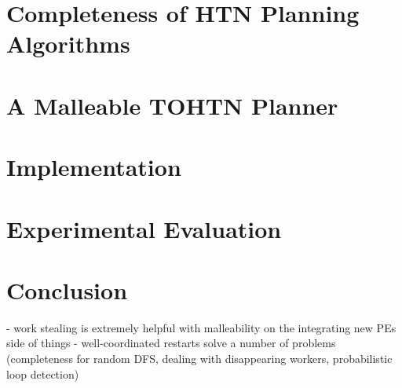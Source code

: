 \documentclass[enabledeprecatedfontcommands,12pt,a4paper,twoside]{scrartcl}
\numberwithin{equation}{section}
\begin{document}
\pagebreak
\section{Completeness of HTN Planning Algorithms}
\label{improv: completeness}

\clearpage
\pagebreak
\section{A Malleable TOHTN Planner}
\label{malleable: overview}


\pagebreak
\section{Implementation}


\clearpage
\pagebreak
\section{Experimental Evaluation}


\pagebreak
\section{Conclusion}

- work stealing is extremely helpful with malleability on the integrating new PEs side of things
- well-coordinated restarts solve a number of problems (completeness for random DFS, dealing with disappearing workers, probabilistic loop detection)



\clearpage




\end{document}
